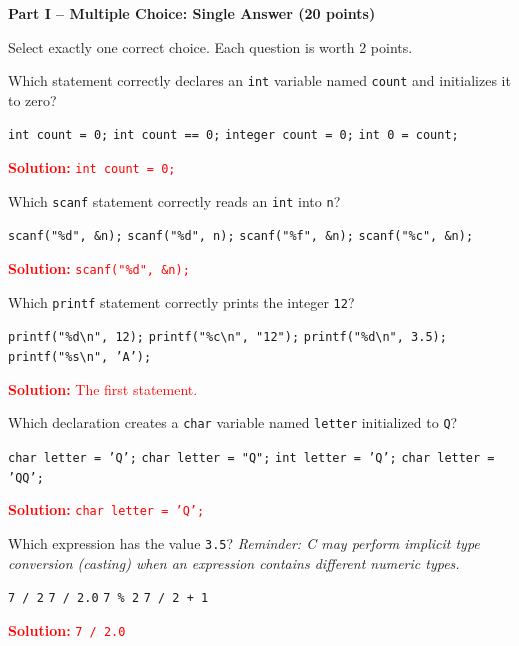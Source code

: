 \documentclass[12pt,a4paper,addpoints]{exam}
\newcommand{\answertext}[1]{%
  \ifprintanswers\par\noindent\textcolor{red}{\textbf{Solution:} #1}\par\fi}
\begin{document}
\newpage
\begin{center}\large\textbf{Part I -- Multiple Choice: Single Answer (20 points)}\end{center}
\noindent Select exactly one correct choice. Each question is worth 2 points.

\begin{questions}
\addpoints

\question[2] Which statement correctly declares an \texttt{int} variable named \texttt{count} and initializes it to zero?
\begin{choices}
  \choice \texttt{int count = 0;}
  \choice \texttt{int count == 0;}
  \choice \texttt{integer count = 0;}
  \choice \texttt{int 0 = count;}
\end{choices}
\answertext{\texttt{int count = 0;}}

\question[2] Which \texttt{scanf} statement correctly reads an \texttt{int} into \texttt{n}?
\begin{choices}
  \choice \texttt{scanf("\%d", \&n);}
  \choice \texttt{scanf("\%d", n);}
  \choice \texttt{scanf("\%f", \&n);}
  \choice \texttt{scanf("\%c", \&n);}
\end{choices}
\answertext{\texttt{scanf("\%d", \&n);}}

\question[2] Which \texttt{printf} statement correctly prints the integer \texttt{12}?
\begin{choices}
  \choice \texttt{printf("\%d\textbackslash n", 12);}
  \choice \texttt{printf("\%c\textbackslash n", "12");}
  \choice \texttt{printf("\%d\textbackslash n", 3.5);}
  \choice \texttt{printf("\%s\textbackslash n", 'A');}
\end{choices}
\answertext{The first statement.}

\question[2] Which declaration creates a \texttt{char} variable named \texttt{letter} initialized to \texttt{Q}?
\begin{choices}
  \choice \texttt{char letter = 'Q';}
  \choice \texttt{char letter = "Q";}
  \choice \texttt{int letter = 'Q';}
  \choice \texttt{char letter = 'QQ';}
\end{choices}
\answertext{\texttt{char letter = 'Q';}}

\question[2] Which expression has the value \texttt{3.5}? \textit{Reminder: C may perform implicit type conversion (casting) when an expression contains different numeric types.}
\begin{choices}
  \choice \texttt{7 / 2}
  \choice \texttt{7 / 2.0}
  \choice \texttt{7 \% 2}
  \choice \texttt{7 / 2 + 1}
\end{choices}
\answertext{\texttt{7 / 2.0}}


\end{questions}
\end{document}
